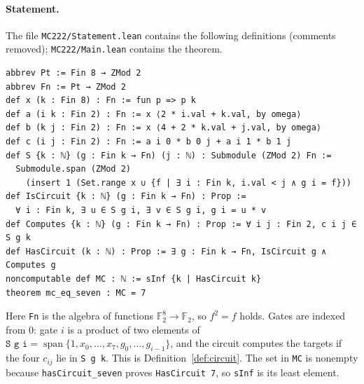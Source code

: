 \documentclass[11pt,a4paper]{article}
\theoremstyle{definition}
\newcommand{\F}{\mathbb{F}}
\newcommand{\spn}{\operatorname{span}}
\newcommand{\code}[1]{\texttt{#1}}
\begin{document}
\paragraph{Statement.} The file \code{MC222/Statement.lean} contains the following definitions (comments removed); \code{MC222/Main.lean} contains the theorem.
\begin{Verbatim}[fontsize=\footnotesize,frame=single,framesep=2mm]
abbrev Pt := Fin 8 → ZMod 2
abbrev Fn := Pt → ZMod 2
def x (k : Fin 8) : Fn := fun p => p k
def a (i k : Fin 2) : Fn := x ⟨2 * i.val + k.val, by omega⟩
def b (k j : Fin 2) : Fn := x ⟨4 + 2 * k.val + j.val, by omega⟩
def c (i j : Fin 2) : Fn := a i 0 * b 0 j + a i 1 * b 1 j
def S {k : ℕ} (g : Fin k → Fn) (j : ℕ) : Submodule (ZMod 2) Fn :=
  Submodule.span (ZMod 2)
    (insert 1 (Set.range x ∪ {f | ∃ i : Fin k, i.val < j ∧ g i = f}))
def IsCircuit {k : ℕ} (g : Fin k → Fn) : Prop :=
  ∀ i : Fin k, ∃ u ∈ S g i, ∃ v ∈ S g i, g i = u * v
def Computes {k : ℕ} (g : Fin k → Fn) : Prop := ∀ i j : Fin 2, c i j ∈ S g k
def HasCircuit (k : ℕ) : Prop := ∃ g : Fin k → Fn, IsCircuit g ∧ Computes g
noncomputable def MC : ℕ := sInf {k | HasCircuit k}
theorem mc_eq_seven : MC = 7
\end{Verbatim}
Here \code{Fn} is the algebra of functions $\F_2^8\to\F_2$, so $f^2=f$ holds. Gates are indexed from $0$: gate $i$ is a product of two elements of $\code{S g i}=\spn\{1,x_0,\dots,x_7,g_0,\dots,g_{i-1}\}$, and the circuit computes the targets if the four $c_{ij}$ lie in \code{S g k}. This is Definition~\ref{def:circuit}. The set in \code{MC} is nonempty because \code{hasCircuit\_seven} proves \code{HasCircuit 7}, so \code{sInf} is its least element.
\end{document}
